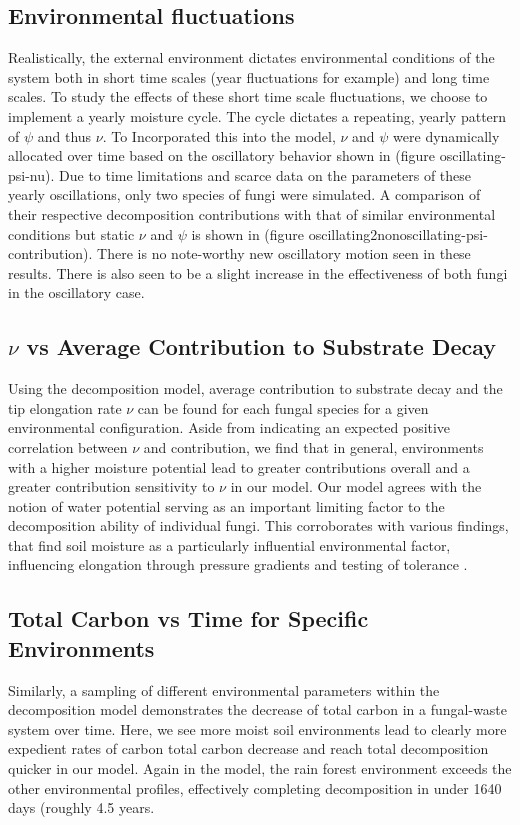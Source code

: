 \documentclass[12pt]{article}
\begin{document}
\begin{multicols}{2}
\subsection{Environmental fluctuations}
Realistically, the external environment dictates environmental conditions of the system both in short time scales (year fluctuations for example) and long time scales. To study the effects of these short time scale fluctuations, we choose to implement a yearly moisture cycle. The cycle dictates a repeating, yearly pattern of $\psi$ and thus $\nu$. To Incorporated this into the model, $\nu$ and $\psi$ were dynamically allocated over time based on the oscillatory behavior shown in (figure oscillating-psi-nu). Due to time limitations and scarce data on the parameters of these yearly oscillations, only two species of fungi were simulated. A comparison of their respective decomposition contributions with that of similar environmental conditions but static $\nu$ and $\psi$ is shown in (figure oscillating2nonoscillating-psi-contribution). There is no note-worthy new oscillatory motion seen in these results. There is also seen to be a slight increase in the effectiveness of both fungi in the oscillatory case. 

\subsection{$\nu$ vs Average Contribution to Substrate Decay} %
Using the decomposition model, average contribution to substrate decay and the tip elongation rate $\nu$ can be found for each fungal species for a given environmental configuration. Aside from indicating an expected positive correlation between $\nu$ and contribution, we find that in general, environments with a higher moisture potential lead to greater contributions overall and a greater contribution sensitivity to $\nu$ in our model. Our model agrees with the notion of water potential serving as an important limiting factor to the decomposition ability of individual fungi. This corroborates with various findings, that find soil moisture as a particularly influential environmental factor, influencing elongation through pressure gradients and testing of tolerance \cite{Maynard2019} \cite{Lustenhouwer2020}. %

\subsection{Total Carbon vs Time for Specific Environments} %
Similarly, a sampling of different environmental parameters within the decomposition model demonstrates the decrease of total carbon in a fungal-waste system over time. Here, we see more moist soil environments lead to clearly more expedient rates of carbon total carbon decrease and reach total decomposition quicker in our model. Again in the model, the rain forest environment exceeds the other environmental profiles, effectively completing decomposition in under 1640 days (roughly 4.5 years.


\end{multicols}
\end{document}
